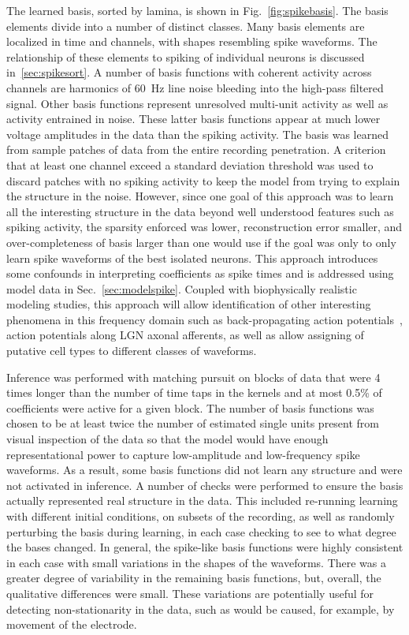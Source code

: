 The learned basis, sorted by lamina, is shown in
Fig.~\ref{fig:spikebasis}. The basis elements divide into a number of
distinct classes. Many basis elements are localized in time and
channels, with shapes resembling spike waveforms. The relationship of
these elements to spiking of individual neurons is discussed
in~\ref{sec:spikesort}. A number of basis functions with coherent
activity across channels are harmonics of 60~Hz line noise bleeding
into the high-pass filtered signal. Other basis functions represent
unresolved multi-unit activity as well as activity entrained in
noise. These latter basis functions appear at much lower voltage
amplitudes in the data than the spiking activity. The basis was
learned from sample patches of data from the entire recording
penetration. A criterion that at least one channel exceed a standard
deviation threshold was used to discard patches with no spiking
activity to keep the model from trying to explain the structure in the
noise. However, since one goal of this approach was to learn all the
interesting structure in the data beyond well understood features such
as spiking activity, the sparsity enforced was lower, reconstruction
error smaller, and over-completeness of basis larger than one would use
if the goal was only to only learn spike waveforms of the best
isolated neurons. This approach introduces some confounds in
interpreting coefficients as spike times and is addressed using model
data in Sec.~\ref{sec:modelspike}. Coupled with biophysically
realistic modeling studies, this approach will allow identification of
other interesting phenomena in this frequency domain such as
back-propagating action potentials~\cite{Buzsaki:1998fk}, action
potentials along LGN axonal afferents, as well as allow assigning of
putative cell types to different classes of waveforms.

Inference was performed with matching pursuit on blocks of data that
were 4 times longer than the number of time taps in the kernels and at
most 0.5\% of coefficients were active for a given block. The number
of basis functions was chosen to be at least twice the number of
estimated single units present from visual inspection of the data so
that the model would have enough representational power to capture
low-amplitude and low-frequency spike waveforms. As a result, some
basis functions did not learn any structure and were not activated in
inference. A number of checks were performed to ensure the basis
actually represented real structure in the data. This included
re-running learning with different initial conditions, on subsets of
the recording, as well as randomly perturbing the basis during
learning, in each case checking to see to what degree the bases
changed. In general, the spike-like basis functions were highly
consistent in each case with small variations in the shapes of the
waveforms. There was a greater degree of variability in the remaining
basis functions, but, overall, the qualitative differences were
small. These variations are potentially useful for detecting
non-stationarity in the data, such as would be caused, for example, by
movement of the electrode.

